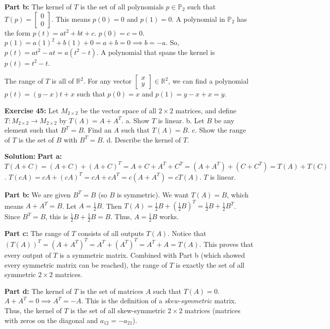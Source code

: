 \documentclass[11pt]{article}
\begin{document}
\textbf{Part b:} The kernel of $T$ is the set of all polynomials $p \in \mathbb{P}_2$ such that $T(p) = \begin{bmatrix} 0 \\ 0 \end{bmatrix}$.
This means $p(0) = 0$ and $p(1) = 0$.
A polynomial in $\mathbb{P}_2$ has the form $p(t) = at^2 + bt + c$.
$p(0) = c = 0$.
$p(1) = a(1)^2 + b(1) + 0 = a + b = 0 \implies b = -a$.
So, $p(t) = at^2 - at = a(t^2 - t)$.
A polynomial that spans the kernel is $p(t) = t^2 - t$.

The range of $T$ is all of $\mathbb{R}^2$. For any vector $\begin{bmatrix} x \\ y \end{bmatrix} \in \mathbb{R}^2$, we can find a polynomial $p(t) = (y-x)t + x$ such that $p(0) = x$ and $p(1) = y-x+x = y$.

\vspace{0.5cm}

\textbf{Exercise 45:} Let $M_{2 \times 2}$ be the vector space of all $2 \times 2$ matrices, and define $T: M_{2 \times 2} \to M_{2 \times 2}$ by $T(A) = A + A^T$.
a. Show $T$ is linear.
b. Let $B$ be any element such that $B^T = B$. Find an $A$ such that $T(A) = B$.
c. Show the range of $T$ is the set of $B$ with $B^T = B$.
d. Describe the kernel of $T$.

\textbf{Solution:}
\textbf{Part a:} 
$T(A+C) = (A+C) + (A+C)^T = A + C + A^T + C^T = (A+A^T) + (C+C^T) = T(A) + T(C)$.
$T(cA) = cA + (cA)^T = cA + cA^T = c(A+A^T) = cT(A)$. $T$ is linear.

\textbf{Part b:} We are given $B^T = B$ (so $B$ is symmetric). We want $T(A) = B$, which means $A + A^T = B$.
Let $A = \frac{1}{2}B$. Then $T(A) = \frac{1}{2}B + (\frac{1}{2}B)^T = \frac{1}{2}B + \frac{1}{2}B^T$. Since $B^T = B$, this is $\frac{1}{2}B + \frac{1}{2}B = B$. Thus, $A = \frac{1}{2}B$ works.

\textbf{Part c:} The range of $T$ consists of all outputs $T(A)$. Notice that $(T(A))^T = (A + A^T)^T = A^T + (A^T)^T = A^T + A = T(A)$. This proves that every output of $T$ is a symmetric matrix. Combined with Part b (which showed every symmetric matrix can be reached), the range of $T$ is exactly the set of all symmetric $2 \times 2$ matrices.

\textbf{Part d:} The kernel of $T$ is the set of matrices $A$ such that $T(A) = 0$.
$A + A^T = 0 \implies A^T = -A$.
This is the definition of a \textit{skew-symmetric} matrix. Thus, the kernel of $T$ is the set of all skew-symmetric $2 \times 2$ matrices (matrices with zeros on the diagonal and $a_{12} = -a_{21}$).
\end{document}
